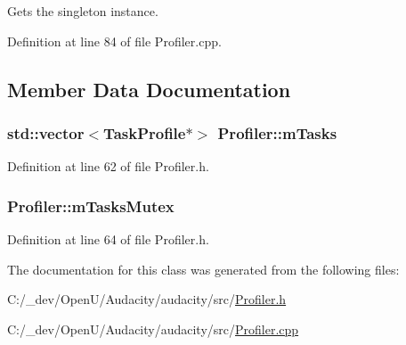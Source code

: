 Gets the singleton instance. 



Definition at line 84 of file Profiler.\+cpp.



\subsection{Member Data Documentation}
\subsubsection[{\texorpdfstring{m\+Tasks}{mTasks}}]{\setlength{\rightskip}{0pt plus 5cm}std\+::vector$<${\bf Task\+Profile}$\ast$$>$ Profiler\+::m\+Tasks\hspace{0.3cm}{\ttfamily [protected]}}\hypertarget{class_profiler_a7798970b1bec9bf595d7cf82cf1b9358}{}\label{class_profiler_a7798970b1bec9bf595d7cf82cf1b9358}


Definition at line 62 of file Profiler.\+h.

\subsubsection[{\texorpdfstring{m\+Tasks\+Mutex}{mTasksMutex}}]{ Profiler\+::m\+Tasks\+Mutex\hspace{0.3cm}{\ttfamily [protected]}}\hypertarget{class_profiler_a8ff7770fe1ccf5542002ed2be12e2a5f}{}\label{class_profiler_a8ff7770fe1ccf5542002ed2be12e2a5f}


Definition at line 64 of file Profiler.\+h.



The documentation for this class was generated from the following files\+:\begin{DoxyCompactItemize}
\item 
C\+:/\+\_\+dev/\+Open\+U/\+Audacity/audacity/src/\hyperlink{_profiler_8h}{Profiler.\+h}\item 
C\+:/\+\_\+dev/\+Open\+U/\+Audacity/audacity/src/\hyperlink{_profiler_8cpp}{Profiler.\+cpp}\end{DoxyCompactItemize}
